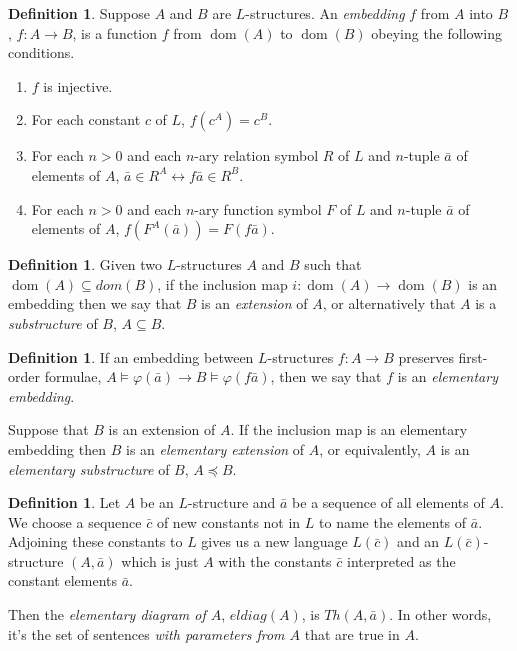 \documentclass[10pt, a4paper, oneside]{article}
\theoremstyle{definition}
\newtheorem{dfn}[thm]{Definition}
\theoremstyle{remark}
\theoremstyle{plain}
\theoremstyle{plain}
\DeclareMathOperator{\dom}{dom}
\begin{document}
\begin{dfn}
    Suppose $A$ and $B$ are $L$-structures. An \emph{embedding} $f$ from $A$
    into $B$, $f : A \rightarrow B$, is a function $f$ from $\dom(A)$ to
    $\dom(B)$ obeying the following conditions.
    
    \begin{enumerate}
        \item $f$ is injective.
        \item For each constant $c$ of $L$, $f(c^A) = c^B$.
        \item For each $n > 0$ and each $n$-ary relation symbol $R$ of $L$ and
              $n$-tuple $\bar{a}$ of elements of $A$, $\bar{a} \in R^A
              \leftrightarrow f\bar{a} \in R^B$.
        \item For each $n > 0$ and each $n$-ary function symbol $F$ of $L$ and
              $n$-tuple $\bar{a}$ of elements of $A$, $f(F^A(\bar{a})) =
              F(f\bar{a})$.
    \end{enumerate}
\end{dfn}

\begin{dfn}
    Given two $L$-structures $A$ and $B$ such that $\dom(A) \subseteq dom(B)$,
    if the inclusion map $i : \dom(A) \rightarrow \dom(B)$ is an embedding then
    we say that $B$ is an \emph{extension} of $A$, or alternatively that $A$ is
    a \emph{substructure} of $B$, $A \subseteq B$.
\end{dfn}

\begin{dfn}
    If an embedding between $L$-structures $f : A \rightarrow B$ preserves
    first-order formulae, $A \models \varphi(\bar{a}) \rightarrow B \models
    \varphi(f\bar{a})$, then we say that $f$ is an \emph{elementary embedding}.
    
    Suppose that $B$ is an extension of $A$. If the inclusion map is an
    elementary embedding then $B$ is an \emph{elementary extension} of $A$, or
    equivalently, $A$ is an \emph{elementary substructure} of $B$, $A
    \preccurlyeq B$.
\end{dfn}

\begin{dfn}
    Let $A$ be an $L$-structure and $\bar{a}$ be a sequence of all elements of
    $A$. We choose a sequence $\bar{c}$ of new constants not in $L$ to name the
    elements of $\bar{a}$. Adjoining these constants to $L$ gives us a new
    language $L(\bar{c})$ and an $L(\bar{c})$-structure $(A, \bar{a})$ which is
    just $A$ with the constants $\bar{c}$ interpreted as the constant elements
    $\bar{a}$.
    
    Then the \emph{elementary diagram of $A$}, $eldiag(A)$, is $Th(A, \bar{a})$.
    In other words, it's the set of sentences \emph{with parameters from $A$}
    that are true in $A$.
\end{dfn}
\end{document}
